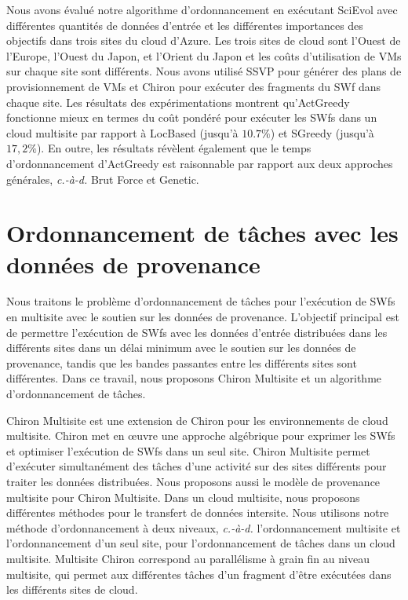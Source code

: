 Nous avons évalué notre algorithme d'ordonnancement en exécutant SciEvol avec différentes quantités de données d'entrée et les différentes importances des objectifs dans trois sites du cloud d'Azure. Les trois sites de cloud sont l'Ouest de l'Europe, l'Ouest du Japon, et l'Orient du Japon et les coûts d'utilisation de VMs sur chaque site sont différents. Nous avons utilisé SSVP pour générer des plans de provisionnement de VMs et Chiron pour exécuter des fragments du SWf dans chaque site.
Les résultats des expérimentations montrent qu'ActGreedy fonctionne mieux en termes du coût pondéré pour exécuter les SWfs dans un cloud multisite par rapport à LocBased (jusqu'à $10.7\%$) et SGreedy (jusqu'à $17,2\%$). En outre, les résultats révèlent également que le temps d'ordonnancement d'ActGreedy est raisonnable par rapport aux deux approches générales, \textit{c.-à-d.} Brut Force et Genetic.

\section*{Ordonnancement de tâches avec les données de provenance}
Nous traitons le problème d'ordonnancement de tâches pour l'exécution de SWfs en multisite avec le soutien sur les données de provenance. L'objectif principal est de permettre l'exécution de SWfs avec les données d'entrée distribuées dans les différents sites dans un délai minimum avec le soutien sur les données de provenance, tandis que les bandes passantes entre les différents sites sont différentes. Dans ce travail, nous proposons Chiron Multisite et un algorithme d'ordonnancement de tâches.

Chiron Multisite est une extension de Chiron pour les environnements de cloud multisite. Chiron met en œuvre une approche algébrique pour exprimer les SWfs et optimiser l'exécution de SWfs dans un seul site. Chiron Multisite permet d'exécuter simultanément des tâches d'une activité sur des sites différents pour traiter les données distribuées. Nous proposons aussi le modèle de provenance multisite pour  Chiron Multisite. Dans un cloud multisite, nous proposons différentes méthodes pour le transfert de données intersite. Nous utilisons notre méthode d'ordonnancement à deux niveaux, \textit{c.-à-d.} l'ordonnancement multisite et l'ordonnancement d'un seul site, pour l'ordonnancement de tâches dans un cloud multisite. Multisite Chiron correspond au parallélisme à grain fin au niveau multisite, qui permet aux différentes tâches d'un fragment d'être exécutées dans les différents sites de cloud.

